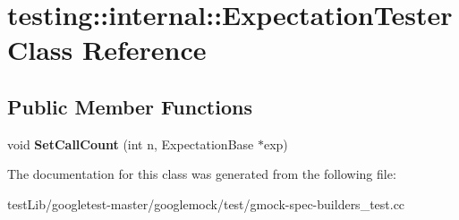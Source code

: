 \hypertarget{classtesting_1_1internal_1_1ExpectationTester}{}\section{testing\+:\+:internal\+:\+:Expectation\+Tester Class Reference}
\label{classtesting_1_1internal_1_1ExpectationTester}
\subsection*{Public Member Functions}
\begin{DoxyCompactItemize}
\item 
\mbox{\label{classtesting_1_1internal_1_1ExpectationTester_af5d762355ef83f414c4b0fc14c8fc943}} 
void {\bfseries Set\+Call\+Count} (int n, Expectation\+Base $\ast$exp)
\end{DoxyCompactItemize}


The documentation for this class was generated from the following file\+:\begin{DoxyCompactItemize}
\item 
test\+Lib/googletest-\/master/googlemock/test/gmock-\/spec-\/builders\+\_\+test.\+cc\end{DoxyCompactItemize}
